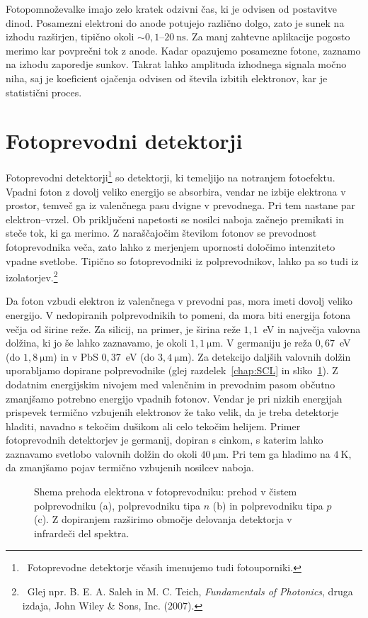 Fotopomnoževalke imajo zelo kratek odzivni čas, ki je odvisen od postavitve dinod. Posamezni 
elektroni do anode potujejo različno dolgo, zato je sunek na izhodu 
razširjen, tipično okoli $\sim 0,1$--$20~\si{\nano\second}$.  
Za manj zahtevne aplikacije pogosto merimo kar povprečni tok z anode. Kadar opazujemo
posamezne fotone, zaznamo na izhodu zaporedje sunkov. Takrat lahko 
amplituda izhodnega signala močno niha, saj je koeficient ojačenja 
odvisen od števila izbitih elektronov, kar je statistični proces. 

\section{Fotoprevodni detektorji}
Fotoprevodni detektorji\footnote{~Fotoprevodne detektorje včasih imenujemo tudi fotouporniki.} 
so detektorji, ki temeljijo na notranjem fotoefektu.
Vpadni foton z dovolj veliko energijo se absorbira, vendar ne izbije elektrona v prostor, 
temveč ga iz valenčnega pasu dvigne v prevodnega. Pri tem nastane par elektron--vrzel. 
Ob priključeni napetosti se nosilci naboja začnejo premikati in steče tok, 
ki ga merimo. Z naraščajočim številom fotonov se prevodnost fotoprevodnika veča, 
zato lahko z merjenjem upornosti določimo 
intenziteto vpadne svetlobe. Tipično so fotoprevodniki iz polprevodnikov, 
lahko pa so tudi iz izolatorjev.\footnote{~Glej npr. 
B. E. A. Saleh in M. C. Teich, 
{\it Fundamentals of Photonics}, druga izdaja, John Wiley \& Sons, Inc. (2007).}

Da foton vzbudi elektron iz valenčnega v prevodni pas, mora imeti dovolj veliko energijo. 
V nedopiranih polprevodnikih to pomeni, da mora biti energija fotona večja od 
širine reže. Za silicij, na primer, je širina reže $1,1$~eV in največja
valovna dolžina, ki jo še lahko zaznavamo, je okoli 
$1,1~\si{\micro\meter}$. V germaniju je reža $0,67$~eV (do $1,8~\si{\micro\meter}$) in v 
PbS $0,37$~eV (do $3,4~\si{\micro\meter}$). 
Za detekcijo daljših valovnih dolžin uporabljamo dopirane 
polprevodnike (glej razdelek~\ref{chap:SCL} 
in sliko~\ref{fig:FPrevodnik}). 
Z dodatnim energijskim nivojem med valenčnim in prevodnim pasom občutno zmanjšamo 
potrebno energijo vpadnih fotonov. Vendar je pri  nizkih energijah prispevek termično 
vzbujenih elektronov že tako velik, da je treba detektorje hladiti, navadno s tekočim
dušikom ali celo tekočim helijem. Primer fotoprevodnih detektorjev je germanij, dopiran s cinkom, 
s katerim lahko zaznavamo svetlobo valovnih dolžin do okoli $40~\si{\micro\meter}$. Pri tem ga hladimo
na $4~\si{\kelvin}$, da zmanjšamo pojav termično vzbujenih nosilcev naboja. 
\begin{figure}[ht]
\centering
\def\svgwidth{150truemm} 

\caption{Shema prehoda elektrona v fotoprevodniku: prehod v čistem polprevodniku (a), 
polprevodniku tipa $n$ (b) in polprevodniku tipa $p$ (c). 
Z dopiranjem razširimo območje delovanja detektorja v infrardeči del spektra. }
\label{fig:FPrevodnik}
\end{figure}

